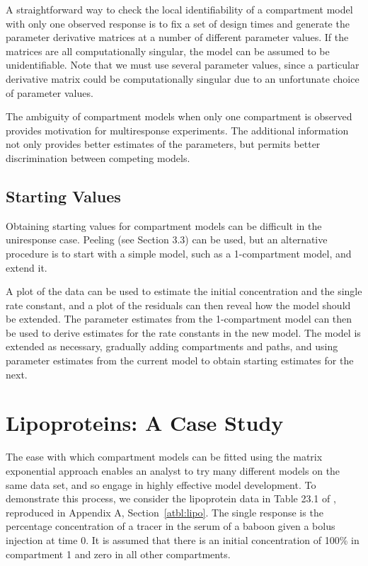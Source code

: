 A straightforward way to check the local identifiability of a
compartment model with only one observed response is to fix
a set of design times and generate the parameter derivative
matrices at a number of different parameter values.
If the matrices are all computationally singular,
the model can be assumed to be unidentifiable.
Note that we must use several parameter values, since a particular
derivative matrix could be computationally singular due to an
unfortunate choice of parameter values.

The ambiguity of compartment models when only one compartment is
observed provides motivation for multiresponse experiments.
The additional information not only provides better estimates of the
parameters, but permits better discrimination between competing
models.

\subsection{Starting Values}

Obtaining starting values for compartment models can be difficult
in the uniresponse case.
Peeling (see Section 3.3) can be used, but an alternative procedure is
to start with a simple model, such as a 1-compartment model, and extend it.

A plot of the data can be used to estimate the initial
concentration and the single rate constant, and a plot of the
residuals can then reveal how the model should be extended.
The parameter estimates from the 1-compartment model can then be used
to derive estimates for the rate constants in the new model.
The model is extended as necessary, gradually adding
compartments and paths, and using parameter estimates from
the current model to obtain starting estimates for the next.

\section{Lipoproteins:  A Case Study}

The ease with which compartment models can be fitted using the
matrix exponential approach enables an analyst to try many
different models on the same data set, and so engage in highly effective
model development.
To demonstrate this process, we consider the
lipoprotein data in Table 23.1 of , reproduced
in Appendix A, Section~\ref{atbl:lipo}.
The single response is the percentage concentration of a tracer in
the serum of a baboon given a bolus injection at time 0.
It is assumed that there is an initial concentration of 100\% in
compartment 1 and zero in all other compartments.

